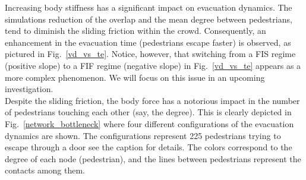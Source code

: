 \documentclass[preprint,12pt]{elsarticle}
\begin{document}
Increasing body stiffness has a significant impact on evacuation dynamics. The simulations reduction of the overlap and the mean degree between pedestrians, tend to diminish the sliding friction within the crowd. Consequently, an enhancement in the evacuation time (pedestrians escape faster) is observed, as pictured in Fig.~\ref{vd_vs_te}. Notice, however, that switching from a FIS regime (positive slope) to a  FIF regime (negative slope) in Fig.~\ref{vd_vs_te} appears as a more complex phenomenon. We will focus on this issue in an upcoming investigation.\\

Despite the sliding friction, the body force has a notorious impact in the number of pedestrians touching each other (say, the degree). This is clearly depicted in Fig.~\ref{network_bottleneck} where four different configurations of the evacuation dynamics are shown. The configurations represent 225 pedestrians trying to escape through a door see the caption for details. The colors correspond to the degree of each node (pedestrian), and the lines between pedestrians represent the contacts among them.\\
\end{document}
